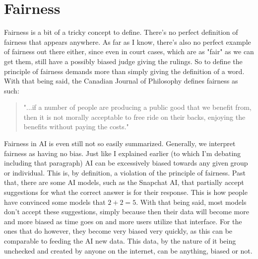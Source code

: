 \documentclass[12pt]{article}
\begin{document}
    \section{Fairness}
    Fairness is a bit of a tricky concept to define. There's no perfect definition of fairness that
    appears anywhere. As far as I know, there's also no perfect example of fairness out there either,
    since even in court cases, which are as "fair" as we can get them, still have a possibly biased
    judge giving the rulings. So to define the principle of fairness demands more than simply giving
    the definition of a word. With that being said, the Canadian Journal of Philosophy defines fairness
    as such:
    \begin{quote}
        "...if a number of people are producing a public good that we benefit from, then it is not
        morally acceptable to free ride on their backs, enjoying the benefits without paying the costs."
    \end{quote}

    Fairness in AI is even still not so easily summarized. Generally, we interpret fairness as having
    no bias. Just like I explained earlier (to which I'm debating including that paragraph) AI can be
    excessively biased towards any given group or individual. This is, by definition, a violation of
    the principle of fairness. Past that, there are some AI models, such as the Snapchat AI, that
    partially accept suggestions for what the correct answer is for their response. This is how people
    have convinced some models that $2+2=5$. With that being said, most models don't accept these
    suggestions, simply because then their data will become more and more biased as time goes on and
    more users utilize that interface. For the ones that do however, they become very biased very
    quickly, as this can be comparable to feeding the AI new data. This data, by the nature of it 
    being unchecked and created by anyone on the internet, can be anything, biased or not.
\end{document}
